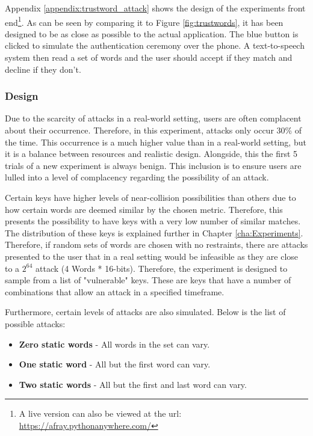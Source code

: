 Appendix \ref{appendix:trustword_attack} shows the design of the experiments front end\footnote{A live version can also be viewed at the url: \url{https://afray.pythonanywhere.com/}}. As can be seen by comparing it to Figure \ref{fig:trustwords}, it has been designed to be as close as possible to the actual application. The blue button is clicked to simulate the authentication ceremony over the phone. A text-to-speech system then read a set of words and the user should accept if they match and decline if they don't.

\subsubsection{Design}

Due to the scarcity of attacks in a real-world setting, users are often complacent about their occurrence. Therefore, in this experiment, attacks only occur 30\% of the time. This occurrence is a much higher value than in a real-world setting, but it is a balance between resources and realistic design. Alongside, this the first 5 trials of a new experiment is always benign. This inclusion is to ensure users are lulled into a level of complacency regarding the possibility of an attack.

Certain keys have higher levels of near-collision possibilities than others due to how certain words are deemed similar by the chosen metric. Therefore, this presents the possibility to have keys with a very low number of similar matches. The distribution of these keys is explained further in Chapter \ref{cha:Experiments}. Therefore, if random sets of words are chosen with no restraints, there are attacks presented to the user that in a real setting would be infeasible as they are close to a $2^{64}$ attack (4 Words * 16-bits). Therefore, the experiment is designed to sample from a list of "vulnerable" keys. These are keys that have a number of combinations that allow an attack in a specified timeframe. 

Furthermore, certain levels of attacks are also simulated. Below is the list of possible attacks:

\begin{itemize}
    \item \textbf{Zero static words} - All words in the set can vary.
    \item \textbf{One static word} - All but the first word can vary.
    \item \textbf{Two static words} - All but the first and last word can vary.
\end{itemize}

